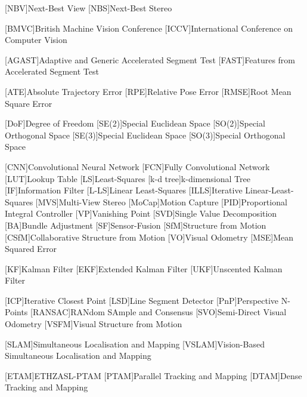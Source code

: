 %
%
%
\begin{acronym}[RANSAC] %
[NBV]{Next-Best View}
[NBS]{Next-Best Stereo}

[BMVC]{British Machine Vision Conference}
[ICCV]{International Conference on Computer Vision}

[AGAST]{Adaptive and Generic Accelerated Segment Test}
[FAST]{Features from Accelerated Segment Test}

[ATE]{Absolute Trajectory Error}
[RPE]{Relative Pose Error}
[RMSE]{Root Mean Square Error}

[DoF]{Degree of Freedom}
[SE(2)]{Special Euclidean Space}
[SO(2)]{Special Orthogonal Space}
[SE(3)]{Special Euclidean Space}
[SO(3)]{Special Orthogonal Space}


[CNN]{Convolutional Neural Network}
[FCN]{Fully Convolutional Network}
[LUT]{Lookup Table}
[LS]{Least-Squares}
[k-d tree]{k-dimensional Tree}
[IF]{Information Filter}
[L-LS]{Linear Least-Squares}
[ILLS]{Iterative Linear-Least-Squares}
[MVS]{Multi-View Stereo}
[MoCap]{Motion Capture}
[PID]{Proportional Integral Controller}
[VP]{Vanishing Point}
[SVD]{Single Value Decomposition}
[BA]{Bundle Adjustment}
[SF]{Sensor-Fusion}
[SfM]{Structure from Motion}
[CSfM]{Collaborative Structure from Motion}
[VO]{Visual Odometry}
[MSE]{Mean Squared Error}

[KF]{Kalman Filter}
[EKF]{Extended Kalman Filter}
[UKF]{Unscented Kalman Filter}

  [ICP]{Iterative Closest Point}
  [LSD]{Line Segment Detector}
  [PnP]{Perspective N-Points}
  [RANSAC]{RANdom SAmple and Consensus}
  [SVO]{Semi-Direct Visual Odometry}
  [VSFM]{Visual Structure from Motion}
  
  [SLAM]{Simultaneous Localisation and Mapping}
  [VSLAM]{Vision-Based Simultaneous Localisation and Mapping}
  
  [ETAM]{ETHZASL-PTAM}
  [PTAM]{Parallel Tracking and Mapping}
  [DTAM]{Dense Tracking and Mapping}


\end{acronym}
